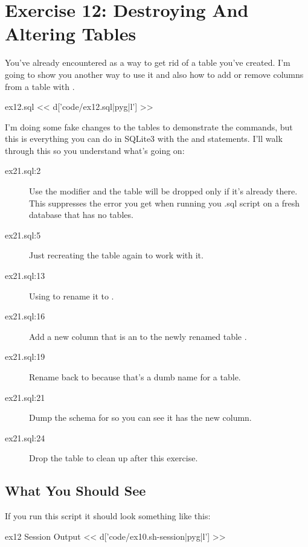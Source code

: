 \chapter{Exercise 12: Destroying And Altering Tables}

You've already encountered  as a way to get rid of
a table you've created.  I'm going to show you another way to use it
and also how to add or remove columns from a table with .

\begin{code}{ex12.sql}
<< d['code/ex12.sql|pyg|l'] >>
\end{code}

I'm doing some fake changes to the tables to demonstrate the commands, but
this is everything you can do in SQLite3 with the  and
 statements.  I'll walk through this so you understand
what's going on:

\begin{description}
\item[ex21.sql:2] Use the  modifier and the table will be dropped
    only if it's already there.  This suppresses the error you get when
    running you .sql script on a fresh database that has no tables.
\item[ex21.sql:5] Just recreating the table again to work with it.
\item[ex21.sql:13] Using  to rename it to .
\item[ex21.sql:16] Add a new column  that is an  to
    the newly renamed table .
\item[ex21.sql:19] Rename  back to  because that's
    a dumb name for a table.
\item[ex21.sql:21] Dump the schema for  so you can see it has the
    new  column.
\item[ex21.sql:24] Drop the table to clean up after this exercise.
\end{description}

\section{What You Should See}

If you run this script it should look something like this:

\begin{code}{ex12 Session Output}
<< d['code/ex10.sh-session|pyg|l'] >>
\end{code}

